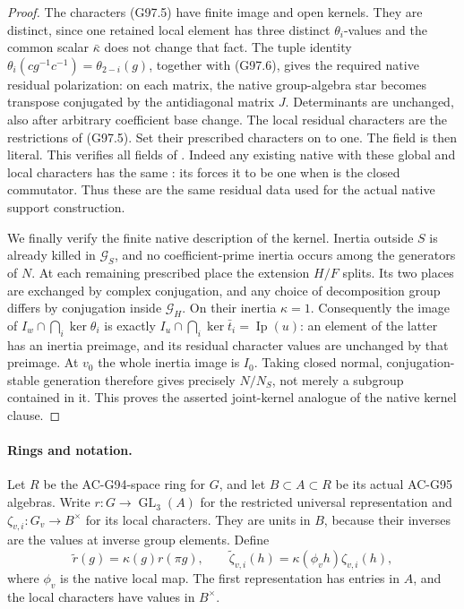 \begin{proof}
The characters (G97.5) have finite image and open kernels.
They are distinct, since one retained local element has
three distinct \(\theta_i\)-values and the common scalar
\(\bar\kappa\) does not change that fact.
The tuple identity
\(\theta_i(cg^{-1}c^{-1})=\theta_{2-i}(g)\), together
with (G97.6), gives the required native residual
polarization: on each matrix, the native group-algebra
star becomes transpose conjugated by the antidiagonal
matrix \(J\).  Determinants are unchanged, also after
arbitrary coefficient base change.
The local residual characters are the restrictions of
(G97.5).  Set their prescribed  characters on
 to one.  The  field is then
literal.  This verifies all fields of .
Indeed any existing native  with these global
and local characters has the same : its
 forces it to be one when  is the
closed commutator.  Thus these are the same residual data
used for the actual native support construction.

We finally verify the finite native description of the
kernel.  Inertia outside \(S\) is already killed in
\(\mathcal G_S\), and no coefficient-prime inertia occurs
among the generators of \(N\).  At each remaining
prescribed place the extension \(H/F\) splits.  Its two
places are exchanged by complex conjugation, and any
choice of decomposition group differs by conjugation
inside \(\mathcal G_H\).  On their inertia \(\kappa=1\).
Consequently the image of
\(I_w\cap\bigcap_i\ker\theta_i\) is exactly
\(I_u\cap\bigcap_i\ker\bar t_i=\operatorname{Ip}(u)\):
an element of the latter has an inertia preimage, and
its residual character values are unchanged by that
preimage.  At \(v_0\) the whole inertia image is \(I_0\).
Taking closed normal, conjugation-stable generation
therefore gives precisely \(N/N_S\), not merely a
subgroup contained in it.  This proves the asserted
joint-kernel analogue of the native kernel clause.
\end{proof}

\paragraph{Rings and notation.}
Let \(R\) be the AC-G94-space ring for \(G\), and let
\(B\subset A\subset R\) be its actual AC-G95 algebras.
Write \(r:G\to\operatorname{GL}_3(A)\) for the restricted
universal representation and
\(\zeta_{v,i}:G_v\to B^\times\) for its local characters.
They are units in \(B\), because their inverses are the
values at inverse group elements.  Define
\[
 \widetilde r(g)=\kappa(g)r(\pi g),\qquad
 \widetilde\zeta_{v,i}(h)
      =\kappa(\phi_v h)\zeta_{v,i}(h),
 \tag{G97.7}
\]
where \(\phi_v\) is the native local map.  The first
representation has entries in \(A\), and the local
characters have values in \(B^\times\).


